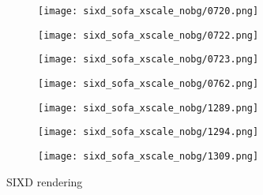 \begin{figure}[h!]
\begin{subfigure}[b]{0.32\linewidth}
    \texttt{[image: sixd\_sofa\_xscale\_nobg/0720.png]}
  \end{subfigure}
  \begin{subfigure}[b]{0.32\linewidth}
    \texttt{[image: sixd\_sofa\_xscale\_nobg/0722.png]}
  \end{subfigure}
  \begin{subfigure}[b]{0.32\linewidth}
    \texttt{[image: sixd\_sofa\_xscale\_nobg/0723.png]}
  \end{subfigure}
  \begin{subfigure}[b]{0.32\linewidth}
    \texttt{[image: sixd\_sofa\_xscale\_nobg/0762.png]}
  \end{subfigure}
  \begin{subfigure}[b]{0.32\linewidth}
    \texttt{[image: sixd\_sofa\_xscale\_nobg/1289.png]}
  \end{subfigure}
  \begin{subfigure}[b]{0.32\linewidth}
    \texttt{[image: sixd\_sofa\_xscale\_nobg/1294.png]}
  \end{subfigure}
  \begin{subfigure}[b]{0.32\linewidth}
    \texttt{[image: sixd\_sofa\_xscale\_nobg/1309.png]}
  \end{subfigure}
  \caption{SIXD rendering }
  \label{fig:sixd_sofa_xscale_nobg}
\end{figure}

